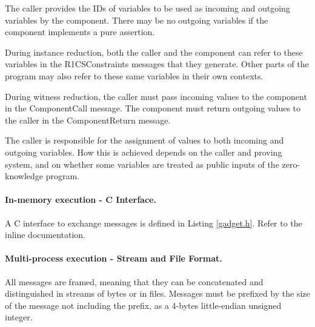 	The caller provides the IDs of variables to be used as incoming and outgoing variables by the component.
	There may be no outgoing variables if the component implements a pure assertion.

	During instance reduction, both the caller and the component can refer to
	these variables in the R1CSConstraints messages that they generate.
	Other parts of the program may also refer to these same variables in their own contexts.

	During witness reduction, the caller must pass incoming values to the component in the ComponentCall message.
	The component must return outgoing values to the caller in the ComponentReturn message.

	The caller is responsible for the assignment of values to both incoming and outgoing variables.
	How this is achieved depends on the caller and proving system,
	and on whether some variables are treated as public inputs of the zero-knowledge program.

\paragraph{In-memory execution - C Interface.}

	A C interface to exchange messages is defined in Listing \ref{gadget.h}.
	Refer to the inline documentation.

\paragraph{Multi-process execution - Stream and File Format.}
	All messages are framed, meaning that they can be concatenated and distinguished in streams of bytes or in files.
	Messages must be prefixed by the size of the message not including the prefix,
	as a 4-bytes little-endian unsigned integer.
